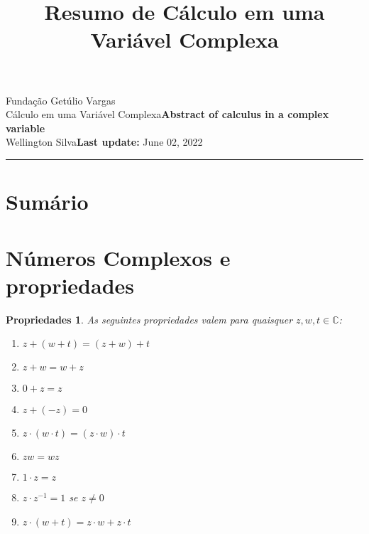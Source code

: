 \documentclass{article}
\title{Resumo de Cálculo em uma Variável Complexa}
\author{}
\date{}
\newtheorem{prop}{Propriedades}
\newcommand{\assignment}{Abstract of calculus in a complex variable}
\newcommand{\duedate}{June 02, 2022}
\begin{document}
Fundação Getúlio Vargas\hfill\\
Cálculo em uma Variável Complexa\hfill\textbf{\assignment}\\
Wellington Silva\hfill\textbf{Last update:} \duedate\\
\smallskip\hrule\bigskip

{\let\newpage\relax\maketitle}

\section*{Sumário}

\textbf{}
\vspace{4.0mm}

\textbf{}
\vspace{4.0mm}

\textbf{}
\vspace{4.0mm}

\textbf{}
\vspace{4.0mm}

\textbf{}
\vspace{4.0mm}

\textbf{}
\vspace{4.0mm}

\textbf{}
\vspace{4.0mm}

\textbf{}
\vspace{4.0mm}

\textbf{}
\vspace{4.0mm}

\textbf{}
\vspace{4.0mm}

\newpage

\section*{Números Complexos e propriedades}
\label{s1}

\begin{prop} As seguintes propriedades valem para quaisquer $z, w, t \in \mathbb{C}$:

\begin{enumerate}[label=(\alph*)]
    \item $z + (w + t) = (z + w) + t$
    \item $z + w = w + z$
    \item $0 + z = z$
    \item $z + (-z) = 0$
    \item $z \cdot (w \cdot t) = (z \cdot w) \cdot t$
    \item $zw = wz$
    \item $1 \cdot z = z$
    \item $z \cdot z^{-1} = 1$ se $z \neq 0$
    \item $z \cdot (w + t) = z \cdot w + z \cdot t$
\end{enumerate}
\end{prop}
\end{document}
